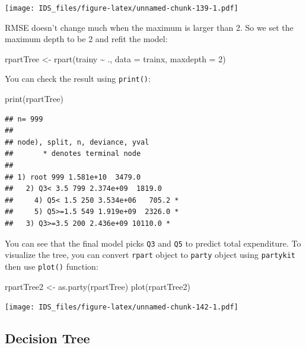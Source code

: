 \documentclass[
  12pt,
]{krantz}
\makeatletter
\newenvironment{Shaded}{\begin{snugshade}}{\end{snugshade}}
\newcommand{\AttributeTok}[1]{\textcolor[rgb]{0.61,0.61,0.61}{#1}}
\newcommand{\DecValTok}[1]{\textcolor[rgb]{0.06,0.06,0.06}{#1}}
\newcommand{\FunctionTok}[1]{\textcolor[rgb]{0,0,0}{#1}}
\newcommand{\NormalTok}[1]{#1}
\newcommand{\OtherTok}[1]{\textcolor[rgb]{0.37,0.37,0.37}{#1}}
\newcommand{\SpecialCharTok}[1]{\textcolor[rgb]{0,0,0}{#1}}
\newenvironment{kframe}{%
\medskip{}
\setlength{\fboxsep}{.8em}
 \def\at@end@of@kframe{}%
 \ifinner\ifhmode%
  \def\at@end@of@kframe{\end{minipage}}%
  \begin{minipage}{\columnwidth}%
 \fi\fi%
 \def\FrameCommand##1{\hskip\@totalleftmargin \hskip-\fboxsep
 \colorbox{shadecolor}{##1}\hskip-\fboxsep
     \hskip-\linewidth \hskip-\@totalleftmargin \hskip\columnwidth}%
 \MakeFramed {\advance\hsize-\width
   \@totalleftmargin\z@ \linewidth\hsize
   \@setminipage}}%
 {\par\unskip\endMakeFramed%
 \at@end@of@kframe}
\renewenvironment{Shaded}{\begin{kframe}}{\end{kframe}}
\makeatother
\begin{document}
\texttt{[image: IDS\_files/figure-latex/unnamed-chunk-139-1.pdf]}

RMSE doesn't change much when the maximum is larger than 2. So we set the maximum depth to be 2 and refit the model:

\begin{Shaded}
\begin{Highlighting}[]
\NormalTok{rpartTree }\OtherTok{\textless{}{-}} \FunctionTok{rpart}\NormalTok{(trainy }\SpecialCharTok{\textasciitilde{}}\NormalTok{ ., }\AttributeTok{data =}\NormalTok{ trainx, }\AttributeTok{maxdepth =} \DecValTok{2}\NormalTok{)}
\end{Highlighting}
\end{Shaded}

You can check the result using \texttt{print()}:

\begin{Shaded}
\begin{Highlighting}[]
\FunctionTok{print}\NormalTok{(rpartTree)}
\end{Highlighting}
\end{Shaded}

\begin{verbatim}
## n= 999 
## 
## node), split, n, deviance, yval
##       * denotes terminal node
## 
## 1) root 999 1.581e+10  3479.0  
##   2) Q3< 3.5 799 2.374e+09  1819.0  
##     4) Q5< 1.5 250 3.534e+06   705.2 *
##     5) Q5>=1.5 549 1.919e+09  2326.0 *
##   3) Q3>=3.5 200 2.436e+09 10110.0 *
\end{verbatim}

You can see that the final model picks \texttt{Q3} and \texttt{Q5} to predict total expenditure. To visualize the tree, you can convert \texttt{rpart} object to \texttt{party} object using \texttt{partykit} then use \texttt{plot()} function:

\begin{Shaded}
\begin{Highlighting}[]
\NormalTok{rpartTree2 }\OtherTok{\textless{}{-}} \FunctionTok{as.party}\NormalTok{(rpartTree)}
\FunctionTok{plot}\NormalTok{(rpartTree2)}
\end{Highlighting}
\end{Shaded}

\texttt{[image: IDS\_files/figure-latex/unnamed-chunk-142-1.pdf]}

\hypertarget{decision-tree}{%
\subsection{Decision Tree}\label{decision-tree}}
\end{document}
